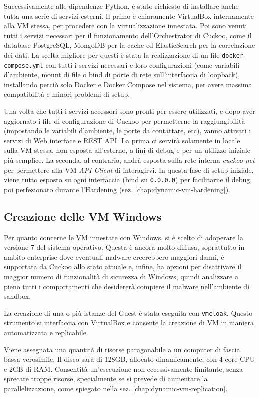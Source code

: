 Successivamente alle dipendenze Python, è stato richiesto di installare anche tutta una serie di servizi esterni.
Il primo è chiaramente VirtualBox internamente alla VM stessa, per procedere con la virtualizzazione innestata.
Poi sono venuti tutti i servizi necessari per il funzionamento dell'Orchestrator di Cuckoo, come il database PostgreSQL, MongoDB per la cache ed ElasticSearch per la correlazione dei dati. La scelta migliore per questi è stata la realizzazione di un file \texttt{docker-compose.yml} con tutti i servizi necessari e loro configurazioni (come variabili d'ambiente, mount di file o bind di porte di rete sull'interfaccia di loopback), installando perciò solo Docker e Docker Compose nel sistema, per avere massima compatibilità e minori problemi di setup.

Una volta che tutti i servizi accessori sono pronti per essere utilizzati, e dopo aver aggiornato i file di configurazione di Cuckoo per permetterne la raggiungibilità (impostando le variabili d'ambiente, le porte da contattare, etc), vanno attivati i servizi di Web interface e REST API.
La prima ci servirà solamente in locale sulla VM stessa, non esposta all'esterno, a fini di debug e per un utilizzo iniziale più semplice. La seconda, al contrario, andrà esposta sulla rete interna \emph{cuckoo-net} per permettere alla VM \emph{API Client} di interagirvi. In questa fase di setup iniziale, viene tutto esposto su ogni interfaccia (bind su \texttt{0.0.0.0}) per facilitarne il debug, poi perfezionato durante l'Hardening (sez. \ref{chap:dynamic-vm-hardening}).

\subsection{Creazione delle VM Windows}
Per quanto concerne le VM innestate con Windows, si è scelto di adoperare la versione 7 del sistema operativo. Questa è ancora molto diffusa, soprattutto in ambito enterprise dove eventuali malware creerebbero maggiori danni, è supportata da Cuckoo allo stato attuale e, infine, ha opzioni per disattivare il maggior numero di funzionalità di sicurezza di Windows, quindi analizzare a pieno tutti i comportamenti che desidererà compiere il malware nell'ambiente di sandbox.

La creazione di una o più istanze del Guest è stata eseguita con \texttt{vmcloak}.
Questo strumento si interfaccia con VirtualBox e consente la creazione di VM in maniera automatizzata e replicabile.

Viene assegnata una quantità di risorse paragonabile a un computer di fascia bassa verosimile. Il disco sarà di 128GB, allocato dinamicamente, con 4 core CPU e 2GB di RAM. Consentità un'esecuzione non eccessivamente limitante, senza sprecare troppe risorse, specialmente se si prevede di aumentare la parallelizzazione, come spiegato nella sez. \ref{chap:dynamic-vm-replication}.

